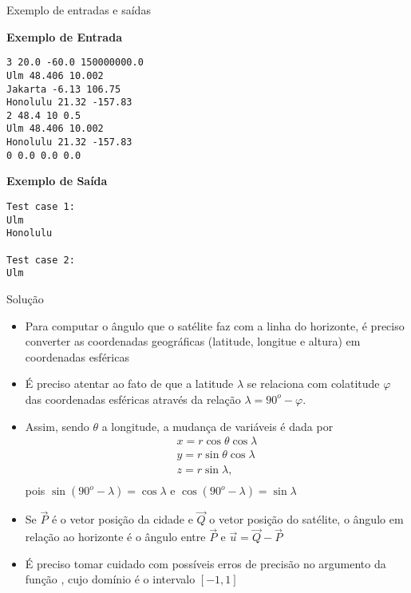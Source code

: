 \begin{frame}[fragile]{Exemplo de entradas e saídas}

\begin{minipage}[t]{0.6\textwidth}
\textbf{Exemplo de Entrada}
\begin{verbatim}
3 20.0 -60.0 150000000.0
Ulm 48.406 10.002
Jakarta -6.13 106.75
Honolulu 21.32 -157.83
2 48.4 10 0.5
Ulm 48.406 10.002
Honolulu 21.32 -157.83
0 0.0 0.0 0.0
\end{verbatim}
\end{minipage}
\begin{minipage}[t]{0.35\textwidth}
\textbf{Exemplo de Saída}
\begin{verbatim}
Test case 1:
Ulm
Honolulu

Test case 2:
Ulm
\end{verbatim}
\end{minipage}
\end{frame}

\begin{frame}[fragile]{Solução}

    \begin{itemize}
        \item Para computar o ângulo que o satélite faz com a linha do horizonte, é preciso
            converter as coordenadas geográficas (latitude, longitue e altura) em coordenadas
            esféricas

        \item É preciso atentar ao fato de que a latitude $\lambda$ se relaciona com colatitude
            $\varphi$ das coordenadas esféricas através da relação
            $ \lambda = 90^o - \varphi$.

        \item Assim, sendo $\theta$ a longitude, a mudança de variáveis é dada por
        \[
            \begin{array}{l}
                x = r\cos \theta\cos \lambda \\
                y = r\sin \theta\cos \lambda \\
                z = r\sin \lambda, \\
            \end{array}
        \]
        pois $\sin (90^o - \lambda) = \cos \lambda$ e $\cos (90^o - \lambda) = \sin \lambda$

        \item Se $\vec{P}$ é o vetor posição da cidade e $\vec{Q}$ o vetor posição do satélite,
            o ângulo em relação ao horizonte é o ângulo entre $\vec{P}$ e $\vec{u} = 
            \vec{Q} - \vec{P}$

        \item É preciso tomar cuidado com possíveis erros de precisão no argumento da função
            , cujo domínio é o intervalo $[-1, 1]$
    \end{itemize}

\end{frame}

